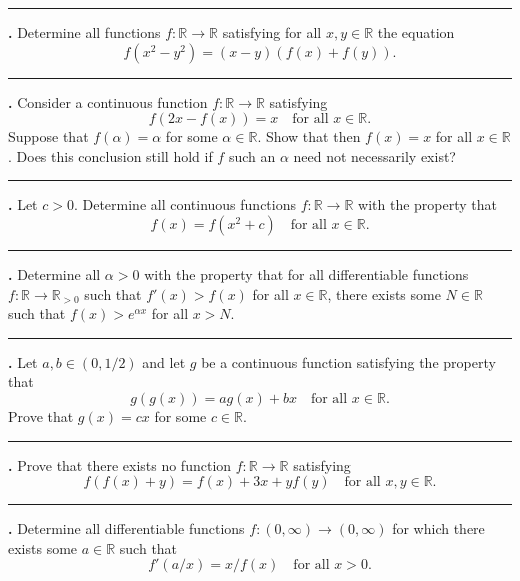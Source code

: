\documentclass[11pt]{article}
\newcounter{probnum}
\newenvironment{problembox}{\par\noindent\rule{\linewidth}{0.5pt}\vspace{5pt}\par}{\vspace{2pt}}
\begin{document}
\begin{problembox}
\textbf{\theprobnum.} Determine all functions $f : \mathbb{R} \to \mathbb{R}$ satisfying for all $x, y \in \mathbb{R}$ the equation
\[
f(x^2 - y^2) = (x-y)(f(x) + f(y)).
\]
\end{problembox}

\begin{problembox}
\textbf{\theprobnum.} Consider a continuous function $f : \mathbb{R} \to \mathbb{R}$ satisfying
\[
f(2x - f(x)) = x \quad \text{for all } x \in \mathbb{R}.
\]
Suppose that $f(\alpha) = \alpha$ for some $\alpha \in \mathbb{R}$. Show that then $f(x) = x$ for all $x \in \mathbb{R}$. Does this conclusion still hold if $f$ such an $\alpha$ need not necessarily exist?
\end{problembox}

\begin{problembox}
\textbf{\theprobnum.} Let $c > 0$. Determine all continuous functions $f : \mathbb{R} \to \mathbb{R}$ with the property that
\[
f(x) = f(x^2 + c) \quad \text{for all } x \in \mathbb{R}.
\]
\end{problembox}

\begin{problembox}
\textbf{\theprobnum.} Determine all $\alpha > 0$ with the property that for all differentiable functions $f : \mathbb{R} \to \mathbb{R}_{>0}$ such that $f'(x) > f(x)$ for all $x \in \mathbb{R}$, there exists some $N \in \mathbb{R}$ such that $f(x) > e^{\alpha x}$ for all $x > N$.
\end{problembox}

\begin{problembox}
\textbf{\theprobnum.} Let $a, b \in (0,1/2)$ and let $g$ be a continuous function satisfying the property that
\[
g(g(x)) = ag(x) + bx \quad \text{for all } x \in \mathbb{R}.
\]
Prove that $g(x) = cx$ for some $c \in \mathbb{R}$.
\end{problembox}

\begin{problembox}
\textbf{\theprobnum.} Prove that there exists no function $f : \mathbb{R} \to \mathbb{R}$ satisfying
\[
f(f(x) + y) = f(x) + 3x + y f(y) \quad \text{for all } x, y \in \mathbb{R}.
\]
\end{problembox}

\begin{problembox}
\textbf{\theprobnum.} Determine all differentiable functions $f : (0,\infty) \to (0,\infty)$ for which there exists some $a \in \mathbb{R}$ such that
\[
f'(a/x) = x / f(x) \quad \text{for all } x > 0.
\]
\end{problembox}
\end{document}
